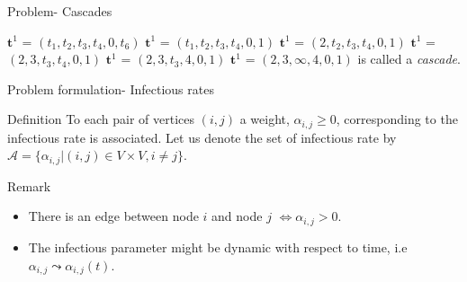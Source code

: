 \documentclass{beamer}
\begin{document}
\begin{frame}{Problem- Cascades}
\begin{figure}
\begin{subfigure}{.4\textwidth}
\end{subfigure}
\end{figure}
 {$\textbf{t}^1$ = $(t_1,t_2,t_3,t_4,0,t_6)$}
 {$\textbf{t}^1$ = $(t_1,t_2,t_3,t_4,0,1)$}
 {$\textbf{t}^1$ = $(2,t_2,t_3,t_4,0,1)$}
 {$\textbf{t}^1$ = $(2,3,t_3,t_4,0,1)$}
 {$\textbf{t}^1$ = $(2,3,t_3,4,0,1)$}
 {$\textbf{t}^1$ = $(2,3,\infty,4,0,1)$ is called a \textit{cascade}.}
\end{frame}
\begin{frame}{Problem formulation- Infectious rates}
\begin{block}{Definition}
To each pair of vertices $(i,j)$ a weight, $\alpha_{i,j} \geq 0$, corresponding to the infectious rate is associated. Let us denote the set of infectious rate by $\mathscr{A} = \{\alpha_{i,j}|(i,j)\in V \times V, i\neq j\}.$
\end{block}
\begin{block}{Remark}
\begin{itemize}
    \item There is an edge between node $i$ and node $j$ $\iff \alpha_{i,j} > 0$.
    \item The infectious parameter might be dynamic with respect to time, i.e $\alpha_{i,j} \leadsto \alpha_{i,j}(t)$.
\end{itemize}
\end{block}
\end{frame}
\end{document}
